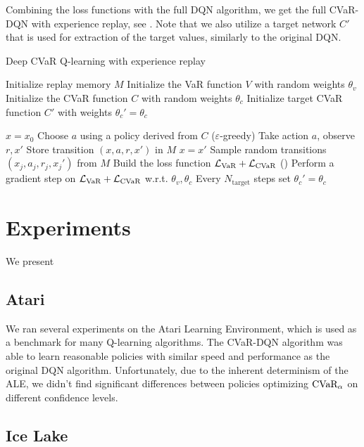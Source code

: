 Combining the loss functions with the full DQN algorithm, we get the full CVaR-DQN with experience replay, see . Note that we also utilize a target network $C'$ that is used for extraction of the target values, similarly to the original DQN. 
\begin{algorithm}
\caption{Deep CVaR Q-learning with experience replay}
\begin{algorithmic}\label{alg:cvardqn}

    \STATE Initialize replay memory $M$
    \STATE Initialize the VaR function $V$ with random weights $\theta_v$
    \STATE Initialize the CVaR function $C$ with random weights $\theta_c$
    \STATE Initialize target CVaR function $C'$ with weights $\theta_c'=\theta_c$

    \STATE $x=x_0$
	\STATE Choose $a$ using a policy derived from $C$ ($\varepsilon$-greedy)
	\STATE Take action $a$, observe $r, x'$
	\STATE Store transition $(x, a, r, x')$ in $M$
	\STATE $x = x'$
	\STATE Sample random transitions $(x_j, a_j, r_j, x_j')$ from $M$
	\STATE Build the loss function $\mathcal{L}_{\text{VaR}} + \mathcal{L}_{\text{CVaR}}$ ()
    \STATE Perform a gradient step on $\mathcal{L}_{\text{VaR}} + \mathcal{L}_{\text{CVaR}}$ w.r.t. $\theta_v, \theta_c$
    \STATE Every $N_\text{target}$ steps set $\theta_c'=\theta_c$
	\ENDWHILE
	\ENDFOR
	
\end{algorithmic}
\end{algorithm}



\section{Experiments}
We present 

\subsection{Atari}
We ran several experiments on the Atari Learning Environment, which is used as a benchmark for many Q-learning algorithms. The CVaR-DQN algorithm was able to learn reasonable policies with similar speed and performance as the original DQN algorithm. Unfortunately, due to the inherent determinism of the ALE, we didn't find significant differences between policies optimizing $\text{CVaR}_\alpha$ on different confidence levels.

\subsection{Ice Lake}


